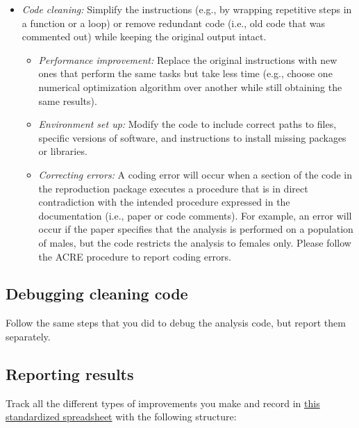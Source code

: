 \documentclass[]{book}
\providecommand{\tightlist}{%
  \setlength{\itemsep}{0pt}\setlength{\parskip}{0pt}}
\begin{document}
\begin{itemize}
\tightlist
\item
  \emph{Code cleaning:} Simplify the instructions (e.g., by wrapping repetitive steps in a function or a loop) or remove redundant code (i.e., old code that was commented out) while keeping the original output intact.

  \begin{itemize}
  \tightlist
  \item
    \emph{Performance improvement:} Replace the original instructions with new ones that perform the same tasks but take less time (e.g., choose one numerical optimization algorithm over another while still obtaining the same results).\\
  \item
    \emph{Environment set up:} Modify the code to include correct paths to files, specific versions of software, and instructions to install missing packages or libraries.\\
  \item
    \emph{Correcting errors:} A coding error will occur when a section of the code in the reproduction package executes a procedure that is in direct contradiction with the intended procedure expressed in the documentation (i.e., paper or code comments). For example, an error will occur if the paper specifies that the analysis is performed on a population of males, but the code restricts the analysis to females only. Please follow the ACRE procedure to report coding errors.
  \end{itemize}
\end{itemize}

\hypertarget{debugging-cleaning-code}{%
\subsection{Debugging cleaning code}\label{debugging-cleaning-code}}

Follow the same steps that you did to debug the analysis code, but report them separately.

\hypertarget{reporting-results}{%
\subsection{Reporting results}\label{reporting-results}}

Track all the different types of improvements you make and record in \href{https://docs.google.com/spreadsheets/d/1LUIdVFH0OfR70C7z07TYeE-uWzKI_JIeWUMaYhqEKK0/edit\#gid=0\&range=A3}{this standardized spreadsheet} with the following structure:
\end{document}
